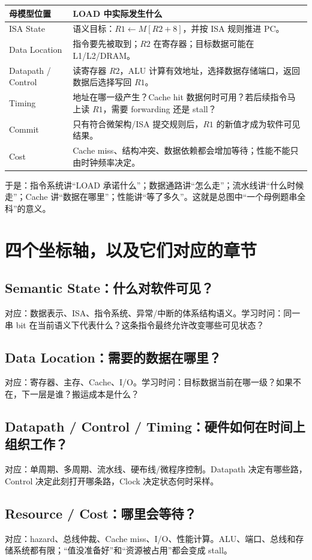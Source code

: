 \documentclass[11pt,a4paper,openany]{ctexbook}
\begin{document}
\begin{longtable}{L{3.0cm}L{\dimexpr\linewidth-3.85cm\relax}}
\toprule
\textbf{母模型位置} & \textbf{LOAD 中实际发生什么}\\
\midrule
ISA State & 语义目标：$R1\leftarrow M[R2+8]$，并按 ISA 规则推进 PC。\\
Data Location & 指令要先被取到；$R2$ 在寄存器；目标数据可能在 L1/L2/DRAM。\\
Datapath / Control & 读寄存器 $R2$，ALU 计算有效地址，选择数据存储端口，返回数据后选择写回 $R1$。\\
Timing & 地址在哪一级产生？Cache hit 数据何时可用？若后续指令马上读 $R1$，需要 forwarding 还是 stall？\\
Commit & 只有符合微架构/ISA 提交规则后，$R1$ 的新值才成为软件可见结果。\\
Cost & Cache miss、结构冲突、数据依赖都会增加等待；性能不能只由时钟频率决定。\\
\bottomrule
\end{longtable}

于是：指令系统讲“LOAD 承诺什么”；数据通路讲“怎么走”；流水线讲“什么时候走”；Cache 讲“数据在哪里”；性能讲“等了多久”。这就是总图中“一个母例题串全科”的意义。

\section{四个坐标轴，以及它们对应的章节}
\subsection{Semantic State：什么对软件可见？}
对应：数据表示、ISA、指令系统、异常/中断的体系结构语义。学习时问：同一串 bit 在当前语义下代表什么？这条指令最终允许改变哪些可见状态？

\subsection{Data Location：需要的数据在哪里？}
对应：寄存器、主存、Cache、I/O。学习时问：目标数据当前在哪一级？如果不在，下一层是谁？搬运成本是什么？

\subsection{Datapath / Control / Timing：硬件如何在时间上组织工作？}
对应：单周期、多周期、流水线、硬布线/微程序控制。Datapath 决定有哪些路，Control 决定此刻打开哪条路，Clock 决定状态何时采样。

\subsection{Resource / Cost：哪里会等待？}
对应：hazard、总线仲裁、Cache miss、I/O、性能计算。ALU、端口、总线和存储系统都有限；“值没准备好”和“资源被占用”都会变成 stall。
\end{document}
